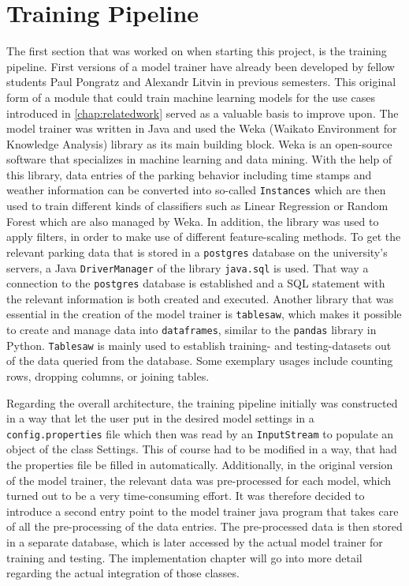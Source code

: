 \section{Training Pipeline}

The first section that was worked on when starting this project, is the training pipeline. First versions of a model trainer have already been developed by fellow students Paul Pongratz and Alexandr Litvin in previous semesters. This original form of a module that could train machine learning models for the use cases introduced in \autoref{chap:relatedwork} served as a valuable basis to improve upon. The model trainer was written in Java and used the Weka (Waikato Environment for Knowledge Analysis) \cite{eibe2016} library as its main building block. Weka is an open-source software that specializes in machine learning and data mining. With the help of this library, data entries of the parking behavior including time stamps and weather information can be converted into so-called \texttt{Instances} which are then used to train different kinds of classifiers such as Linear Regression or Random Forest which are also managed by Weka. In addition, the library was used to apply filters, in order to make use of different feature-scaling methods. To get the relevant parking data that is stored in a \texttt{postgres} database on the university's servers, a Java \texttt{DriverManager} of the library \texttt{java.sql} is used. That way a connection to the \texttt{postgres} database is established and a SQL statement with the relevant information is both created and executed. Another library that was essential in the creation of the model trainer is \texttt{tablesaw}, which makes it possible to create and manage data into \texttt{dataframes}, similar to the \texttt{pandas} library in Python. \texttt{Tablesaw} is mainly used to establish training- and testing-datasets out of the data queried from the database. Some exemplary usages include counting rows, dropping columns, or joining tables. 

Regarding the overall architecture, the training pipeline initially was constructed in a way that let the user put in the desired model settings in a \texttt{config.properties} file which then was read by an \texttt{InputStream} to populate an object of the class Settings. This of course had to be modified in a way, that had the properties file be filled in automatically. Additionally, in the original version of the model trainer, the relevant data was pre-processed for each model, which turned out to be a very time-consuming effort. It was therefore decided to introduce a second entry point to the model trainer java program that takes care of all the pre-processing of the data entries. The pre-processed data is then stored in a separate database, which is later accessed by the actual model trainer for training and testing. The implementation chapter will go into more detail regarding the actual integration of those classes.

